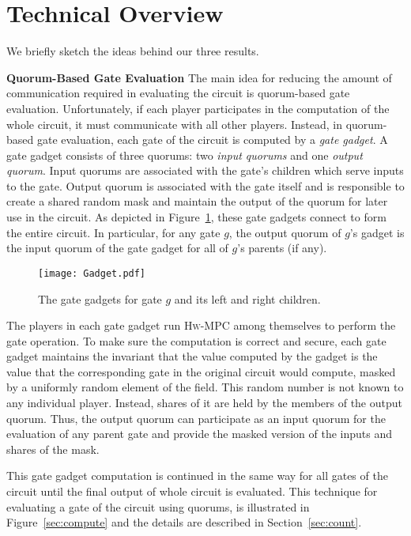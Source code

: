 \documentclass[10pt]{llncs}
\newcommand{\hw}{\textsc{Hw-MPC}\xspace}
\begin{document}
\section{Technical Overview}

We briefly sketch the ideas behind our three results.

\smallskip
\noindent
{\bf Quorum-Based Gate Evaluation} The main idea for reducing the
amount of communication required in evaluating the circuit is
quorum-based gate evaluation. Unfortunately, if each player
participates in the computation of the whole circuit, it must
communicate with all other players. Instead, in quorum-based gate
evaluation, each gate of the circuit is computed by a \emph{gate
  gadget}. A gate gadget consists of three quorums: two \emph{input
  quorums} and one \emph{output quorum}. Input quorums are associated
with the gate's children which serve inputs to the gate. Output quorum
is associated with the gate itself and is responsible to create a
shared random mask and maintain the output of the quorum for later use
in the circuit. As depicted in Figure~\ref{f:gadget}, these gate
gadgets connect to form the entire circuit. In particular, for any
gate $g$, the output quorum of $g$'s gadget is the input quorum of the
gate gadget for all of $g$'s parents (if any).

\begin{figure}[t]
 \begin{center}
 \texttt{[image: Gadget.pdf]}
 \end{center}
 \caption{The gate gadgets for gate $g$ and its left and right children.}
 \label{f:gadget}
 \end{figure}

The players in each gate gadget run \hw among themselves to perform
the gate operation. To make sure the computation is correct and
secure, each gate gadget maintains the invariant that the value
computed by the gadget is the value that the corresponding gate in the
original circuit would compute, masked by a uniformly random element
of the field. This random number is not known to any individual
player. Instead, shares of it are held by the members of the output
quorum.  Thus, the output quorum can participate as an input quorum
for the evaluation of any parent gate and provide the masked version
of the inputs and shares of the mask.

This gate gadget computation is continued in the same way for all
gates of the circuit until the final output of whole circuit is
evaluated.  This technique for evaluating a gate of the circuit using
quorums, is illustrated in Figure~\ref{sec:compute} and the details
are described in Section~\ref{sec:count}.  
\end{document}
